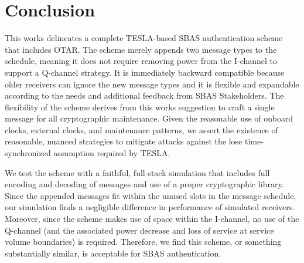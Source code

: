 \documentclass[letterpaper,times]{IONconf/IONconf}
\begin{document}
\section{Conclusion} \label{sec:conclusion}

	This works delineates a complete TESLA-based SBAS authentication scheme that includes OTAR.
	The scheme merely appends two message types to the schedule, meaning it does not require removing power from the I-channel to support a Q-channel strategy.
	It is immediately backward compatible because older receivers can ignore the new message types and it is flexible and expandable according to the needs and additional feedback from SBAS Stakeholders.
	The flexibility of the scheme derives from this works suggestion to craft a single message for all cryptographic maintenance.
	Given the reasonable use of onboard clocks, external clocks, and maintenance patterns, we assert the existence of reasonable, nuanced strategies to mitigate attacks against the lose time-synchronized assumption required by TESLA.

	We test the scheme with a faithful, full-stack simulation that includes full encoding and decoding of messages and use of a proper cryptographic library.
	Since the appended messages fit within the unused slots in the message schedule, our simulation finds a negligible difference in performance of simulated receivers.
	Moreover, since the scheme makes use of space within the I-channel, no use of the Q-channel (and the associated power decrease and loss of service at service volume boundaries) is required.
	Therefore, we find this scheme, or something substantially similar, is acceptable for SBAS authentication.



\end{document}
